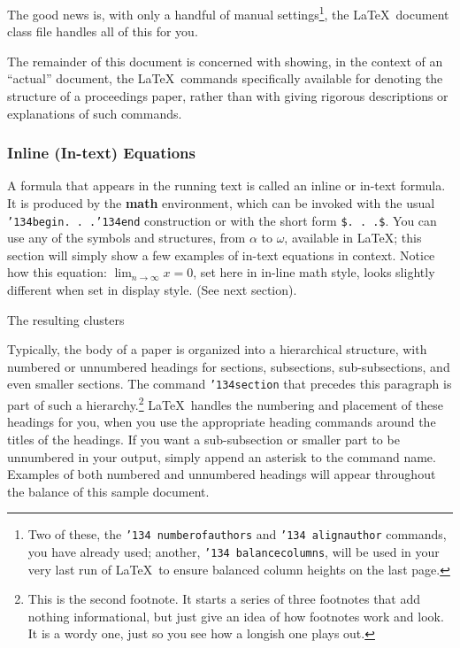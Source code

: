 \documentclass{acm_proc_article-sp}
\begin{document}
The good news is, with only a handful of manual
settings\footnote{Two of these, the {\texttt{\char'134 numberofauthors}}
and {\texttt{\char'134 alignauthor}} commands, you have
already used; another, {\texttt{\char'134 balancecolumns}}, will
be used in your very last run of \LaTeX\ to ensure
balanced column heights on the last page.}, the \LaTeX\ document
class file handles all of this for you.

The remainder of this document is concerned with showing, in
the context of an ``actual'' document, the \LaTeX\ commands
specifically available for denoting the structure of a
proceedings paper, rather than with giving rigorous descriptions
or explanations of such commands.

\subsubsection{Inline (In-text) Equations}
A formula that appears in the running text is called an
inline or in-text formula.  It is produced by the
\textbf{math} environment, which can be
invoked with the usual \texttt{{\char'134}begin. . .{\char'134}end}
construction or with the short form \texttt{\$. . .\$}. You
can use any of the symbols and structures,
from $\alpha$ to $\omega$, available in
\LaTeX\cite{Lamport:LaTeX}; this section will simply show a
few examples of in-text equations in context. Notice how
this equation: \begin{math}\lim_{n\rightarrow \infty}x=0\end{math},
set here in in-line math style, looks slightly different when
set in display style.  (See next section).


The resulting clusters 

Typically, the body of a paper is organized
into a hierarchical structure, with numbered or unnumbered
headings for sections, subsections, sub-subsections, and even
smaller sections.  The command \texttt{{\char'134}section} that
precedes this paragraph is part of such a
hierarchy.\footnote{This is the second footnote.  It
starts a series of three footnotes that add nothing
informational, but just give an idea of how footnotes work
and look. It is a wordy one, just so you see
how a longish one plays out.} \LaTeX\ handles the numbering
and placement of these headings for you, when you use
the appropriate heading commands around the titles
of the headings.  If you want a sub-subsection or
smaller part to be unnumbered in your output, simply append an
asterisk to the command name.  Examples of both
numbered and unnumbered headings will appear throughout the
balance of this sample document.
\end{document}
